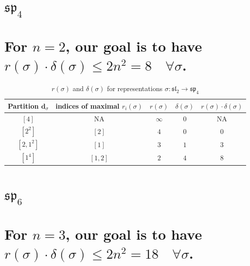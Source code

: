 \documentclass{article}%
\begin{document}
%
\normalsize%
\section{$\mathfrak{sp}_{4}$}%
\section*{For $n=2$, our goal is to have $r(\sigma) \cdot \delta(\sigma) \leq 2n^2 = 8 \quad \forall \sigma$.}%

%
\linebreak%

    \begin{center}
    \label{table:sp_4}
    \begin{longtable}{||c|c|c|c|c||}
    \caption{$r(\sigma)$ and $\delta(\sigma)$ for representations $\sigma: \mathfrak{sl}_2 \to \mathfrak{sp}_{4}$}
    \hline
    Partition $\textbf{d}_\sigma$
    &indices of maximal $r_i(\sigma)$
    &$r(\sigma)$
    &$\delta(\sigma)$
    &$r(\sigma) \cdot \delta(\sigma)$
    \\ [0.3ex] \hline\endhead
    $[4]$ & NA & $\infty$ & $0$ & NA \\ \hline 
$[2^{2}]$ & $[2]$ & $4$ & $0$ & $0$ \\ \hline 
$[2, 1^{2}]$ & $[1]$ & $3$ & $1$ & $3$ \\ \hline 
$[1^{4}]$ & $[1, 2]$ & $2$ & $4$ & $8$ \\ \hline 
    \end{longtable}
    \end{center}
\newpage

%
\section{$\mathfrak{sp}_{6}$}%
\section*{For $n=3$, our goal is to have $r(\sigma) \cdot \delta(\sigma) \leq 2n^2 = 18 \quad \forall \sigma$.}%

%
\linebreak%
\end{document}
